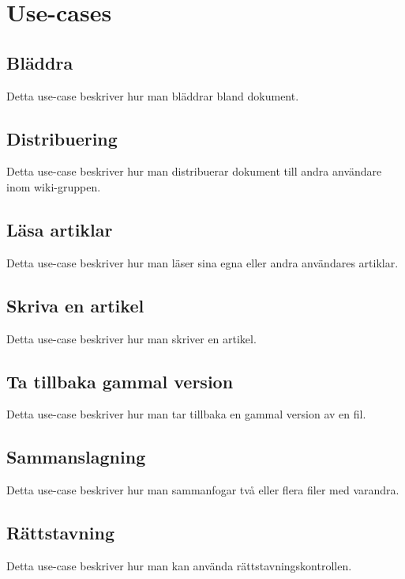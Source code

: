 \section{Use-cases}
\subsection{Bläddra}
Detta use-case beskriver hur man bläddrar bland dokument.
\subsection{Distribuering}
Detta use-case beskriver hur man distribuerar dokument till andra användare inom wiki-gruppen.
\subsection{Läsa artiklar}
Detta use-case beskriver hur man läser sina egna eller andra användares artiklar.
\subsection{Skriva en artikel}
Detta use-case beskriver hur man skriver en artikel.
\subsection{Ta tillbaka gammal version}
Detta use-case beskriver hur man tar tillbaka en gammal version av en fil.
\subsection{Sammanslagning}
Detta use-case beskriver hur man sammanfogar två eller flera filer med varandra.
\subsection{Rättstavning}
Detta use-case beskriver hur man kan använda rättstavningskontrollen.

